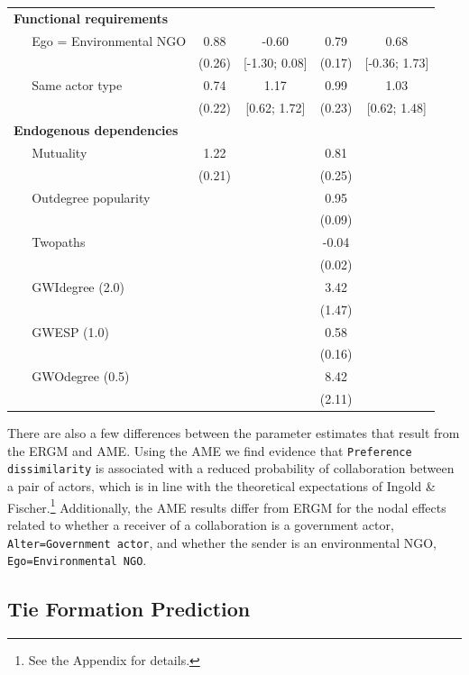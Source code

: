 \documentclass[12pt,pdflatex]{elsarticle}
\begin{document}
\begin{table}[ht]
\begin{tabular}{lcccc}
  \textbf{Functional requirements} &  &  &  &  \\ 
  $\;\;\;\;$ Ego = Environmental NGO & 0.88 & -0.60 & 0.79 & 0.68 \\ 
   & (0.26) & [-1.30; 0.08] & (0.17) & [-0.36; 1.73] \\ 
  $\;\;\;\;$ Same actor type & 0.74 & 1.17 & 0.99 & 1.03 \\ 
   & (0.22) & [0.62; 1.72] & (0.23) & [0.62; 1.48] \\ 
  \textbf{Endogenous dependencies} &  &  &  &  \\ 
  $\;\;\;\;$ Mutuality & 1.22 &  & 0.81 &  \\ 
   & (0.21) &  & (0.25) &  \\ 
  $\;\;\;\;$ Outdegree popularity &  &  & 0.95 &  \\ 
   &  &  & (0.09) &  \\ 
  $\;\;\;\;$ Twopaths &  &  & -0.04 &  \\ 
   &  &  & (0.02) &  \\ 
  $\;\;\;\;$ GWIdegree (2.0) &  &  & 3.42 &  \\ 
   &  &  & (1.47) &  \\ 
  $\;\;\;\;$ GWESP (1.0) &  &  & 0.58 &  \\ 
   &  &  & (0.16) &  \\ 
  $\;\;\;\;$ GWOdegree (0.5) &  &  & 8.42 &  \\ 
   &  &  & (2.11) &  \\ 
   \hline\hline
\end{tabular}
\label{tab:regTable}
\end{table}
\FloatBarrier

There are also a few differences between the parameter estimates that result from the ERGM and AME. Using the AME we find evidence that \texttt{Preference dissimilarity} is associated with a reduced probability of collaboration between a pair of actors, which is in line with the theoretical expectations of Ingold \& Fischer.\footnote{See the Appendix for details.} Additionally, the AME results differ from ERGM for the nodal effects related to whether a receiver of a collaboration is a government actor, \texttt{Alter=Government actor}, and whether the sender is an environmental NGO, \texttt{Ego=Environmental NGO}.

\subsection*{Tie Formation Prediction}
\end{document}
